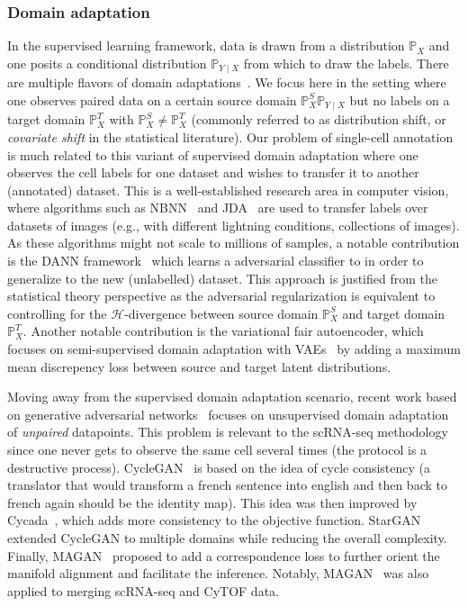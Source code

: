 \subsubsection{Domain adaptation}
In the supervised learning framework, data is drawn from a distribution $\mathbb{P}_X$ and one posits a conditional distribution $\mathbb{P}_{Y \mid X}$ from which to draw the labels. There are multiple flavors of domain adaptations~\cite{kouw2019review}. We focus here in the setting where one observes paired data on a certain source domain $\mathbb{P}_X^{S}\mathbb{P}_{Y \mid X}$ but no labels on a target domain $\mathbb{P}_X^{T}$ with $\mathbb{P}_X^{S} \neq \mathbb{P}_X^{T}$ (commonly referred to as distribution shift, or \textit{covariate shift} in the statistical literature). Our problem of single-cell annotation is much related to this variant of supervised domain adaptation where one observes the cell labels for one dataset and wishes to transfer it to another (annotated) dataset. This is a well-established research area in computer vision, where algorithms such as NBNN~\cite{6751221} and JDA~\cite{6751384} are used to transfer labels over datasets of images (e.g., with different lightning conditions, collections of images). As these algorithms might not scale to millions of samples, a notable contribution is the 
DANN framework~\cite{ganin2016domain} which learns a adversarial classifier to in order to generalize to the new (unlabelled) dataset. This approach is justified from the statistical theory perspective as the adversarial regularization is equivalent to controlling for the $\mathcal{H}$-divergence between source domain $\mathbb{P}_X^{S}$ and target domain $\mathbb{P}_X^{T}$. Another notable contribution is the variational fair autoencoder, which focuses on semi-supervised domain adaptation with VAEs~\cite{VFAE} by adding a maximum mean discrepency \cite{MMD} loss between source and target latent distributions. 

Moving away from the supervised domain adaptation scenario, recent work based on generative adversarial networks~\cite{goodfellow2014generative} focuses on unsupervised domain adaptation of \emph{unpaired} datapoints. This problem is relevant to the scRNA-seq methodology since one never gets to observe the same cell several times (the protocol is a destructive process). CycleGAN~\cite{zhu2017unpaired} is based on the idea of cycle consistency (a translator that would transform a french sentence into english and then back to french again should be the identity map). This idea was then improved by Cycada~\cite{pmlr-v80-hoffman18a}, which adds more consistency to the objective function. StarGAN~\cite{choi2018stargan} extended CycleGAN to multiple domains while reducing the overall complexity. Finally, MAGAN~\cite{amodio2018magan} proposed to add a correspondence loss to further orient the manifold alignment and facilitate the inference. Notably, MAGAN~\cite{amodio2018magan} was also applied to merging scRNA-seq and CyTOF data.

